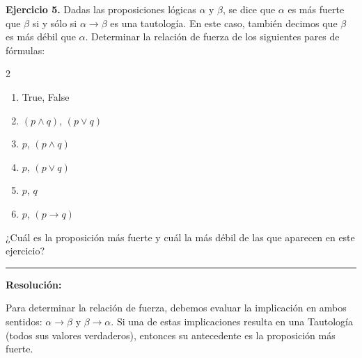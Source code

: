 \hypertarget{ej5}{}
\noindent \textbf{Ejercicio 5.} Dadas las proposiciones lógicas $\alpha$ y $\beta$, se dice que $\alpha$ es más fuerte que $\beta$ si y sólo si $\alpha \rightarrow \beta$ es una tautología. En este caso, también decimos que $\beta$ es más débil que $\alpha$. Determinar la relación de fuerza de los siguientes pares de fórmulas:

\begin{multicols}{2}
\begin{enumerate}[label=\alph*)]
    \item True, False
    \item $(p \wedge q)$, $(p \vee q)$
    \item $p$, $(p \wedge q)$
    \item $p$, $(p \vee q)$
    \item $p$, $q$
    \item $p$, $(p \rightarrow q)$
\end{enumerate}
\end{multicols}

\noindent ¿Cuál es la proposición más fuerte y cuál la más débil de las que aparecen en este ejercicio?

\vspace{0.2cm}
{\color{gray}\hrule}
\vspace{0.4cm}

\textbf{Resolución:}

Para determinar la relación de fuerza, debemos evaluar la implicación en ambos sentidos: $\alpha \rightarrow \beta$ y $\beta \rightarrow \alpha$. Si una de estas implicaciones resulta en una Tautología (todos sus valores verdaderos), entonces su antecedente es la proposición más fuerte.


